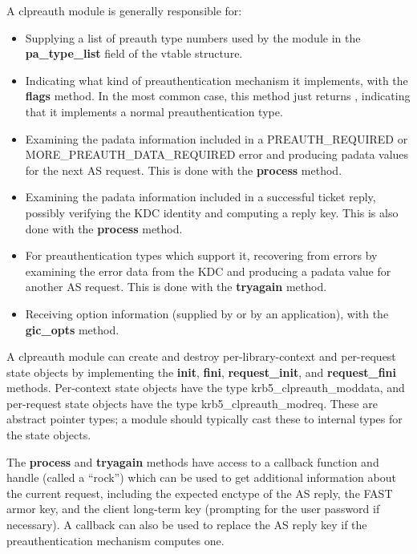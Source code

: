 \documentclass[letterpaper,10pt,english]{sphinxmanual}
\begin{document}
A clpreauth module is generally responsible for:
\begin{itemize}
\item {} 
Supplying a list of preauth type numbers used by the module in the
\textbf{pa\_type\_list} field of the vtable structure.

\item {} 
Indicating what kind of preauthentication mechanism it implements,
with the \textbf{flags} method.  In the most common case, this method
just returns , indicating that it implements a normal
preauthentication type.

\item {} 
Examining the padata information included in a PREAUTH\_REQUIRED or
MORE\_PREAUTH\_DATA\_REQUIRED error and producing padata values for the
next AS request.  This is done with the \textbf{process} method.

\item {} 
Examining the padata information included in a successful ticket
reply, possibly verifying the KDC identity and computing a reply
key.  This is also done with the \textbf{process} method.

\item {} 
For preauthentication types which support it, recovering from errors
by examining the error data from the KDC and producing a padata
value for another AS request.  This is done with the \textbf{tryagain}
method.

\item {} 
Receiving option information (supplied by  or by an
application), with the \textbf{gic\_opts} method.

\end{itemize}

A clpreauth module can create and destroy per-library-context and
per-request state objects by implementing the \textbf{init}, \textbf{fini},
\textbf{request\_init}, and \textbf{request\_fini} methods.  Per-context state
objects have the type krb5\_clpreauth\_moddata, and per-request state
objects have the type krb5\_clpreauth\_modreq.  These are abstract
pointer types; a module should typically cast these to internal
types for the state objects.

The \textbf{process} and \textbf{tryagain} methods have access to a callback
function and handle (called a ``rock'') which can be used to get
additional information about the current request, including the
expected enctype of the AS reply, the FAST armor key, and the client
long-term key (prompting for the user password if necessary).  A
callback can also be used to replace the AS reply key if the
preauthentication mechanism computes one.
\end{document}
